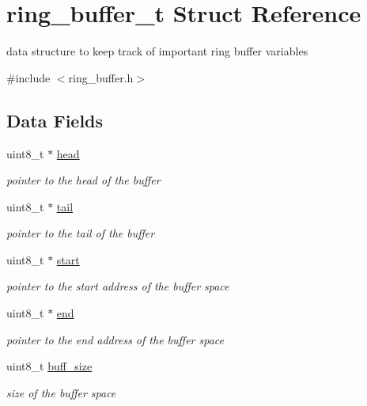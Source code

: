 \hypertarget{structring__buffer__t}{}\section{ring\+\_\+buffer\+\_\+t Struct Reference}
\label{structring__buffer__t}


data structure to keep track of important ring buffer variables  




{\ttfamily \#include $<$ring\+\_\+buffer.\+h$>$}

\subsection*{Data Fields}
\begin{DoxyCompactItemize}
\item 
uint8\+\_\+t $\ast$ \hyperlink{structring__buffer__t_a102cac6eb6f8f341f1891c0905181491}{head}
\begin{DoxyCompactList}\small\item\em pointer to the head of the buffer \end{DoxyCompactList}\item 
uint8\+\_\+t $\ast$ \hyperlink{structring__buffer__t_af7a2fe8e3fd152742f9d54354ad99db7}{tail}
\begin{DoxyCompactList}\small\item\em pointer to the tail of the buffer \end{DoxyCompactList}\item 
uint8\+\_\+t $\ast$ \hyperlink{structring__buffer__t_a7b78fc8dde7c5c2b76176106e087b1de}{start}
\begin{DoxyCompactList}\small\item\em pointer to the start address of the buffer space \end{DoxyCompactList}\item 
uint8\+\_\+t $\ast$ \hyperlink{structring__buffer__t_abd1acb187be8f3b30a79336d4962993f}{end}
\begin{DoxyCompactList}\small\item\em pointer to the end address of the buffer space \end{DoxyCompactList}\item 
uint8\+\_\+t \hyperlink{structring__buffer__t_afd186f1012b3e5a3eca43a965bfa5adb}{buff\+\_\+size}
\begin{DoxyCompactList}\small\item\em size of the buffer space \end{DoxyCompactList}\item 

\end{DoxyCompactItemize}
